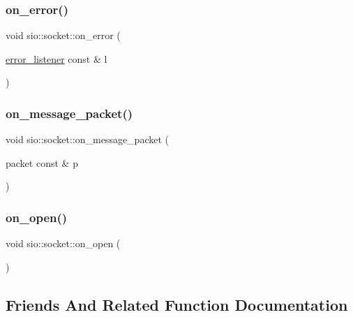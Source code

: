 \subsubsection{\texorpdfstring{on\+\_\+error()}{on\_error()}}
{\footnotesize\ttfamily void sio\+::socket\+::on\+\_\+error (\begin{DoxyParamCaption}\item[{\hyperlink{classsio_1_1socket_aecfea28271032e09dde1567bbfa97898}{error\+\_\+listener} const \&}]{l }\end{DoxyParamCaption})}

\mbox{\label{classsio_1_1socket_ac91742e3084791e30551e72e7ba17609}} 
\subsubsection{\texorpdfstring{on\+\_\+message\+\_\+packet()}{on\_message\_packet()}}
{\footnotesize\ttfamily void sio\+::socket\+::on\+\_\+message\+\_\+packet (\begin{DoxyParamCaption}\item[{packet const \&}]{p }\end{DoxyParamCaption})\hspace{0.3cm}{\ttfamily [protected]}}

\mbox{\label{classsio_1_1socket_a8a793585b4aeb090bc001036d6786f97}} 
\subsubsection{\texorpdfstring{on\+\_\+open()}{on\_open()}}
{\footnotesize\ttfamily void sio\+::socket\+::on\+\_\+open (\begin{DoxyParamCaption}{ }\end{DoxyParamCaption})\hspace{0.3cm}{\ttfamily [protected]}}



\subsection{Friends And Related Function Documentation}
\mbox{\label{classsio_1_1socket_a9598885c403f201c146fd19d243051df}} 
